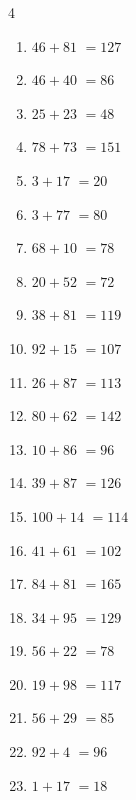 \begin{multicols}{4}
\begin{enumerate}
  \item $46+81$
        $=127$

  \item $46+40$
        $=86$

  \item $25+23$
        $=48$

  \item $78+73$
        $=151$

  \item $3+17$
        $=20$

  \item $3+77$
        $=80$

  \item $68+10$
        $=78$

  \item $20+52$
        $=72$

\columnbreak %

\resetques

  \item $38+81$
        $=119$

  \item $92+15$
        $=107$

  \item $26+87$
        $=113$

  \item $80+62$
        $=142$

  \item $10+86$
        $=96$

  \item $39+87$
        $=126$

  \item $100+14$
        $=114$

  \item $41+61$
        $=102$

  \item $84+81$
        $=165$

  \item $34+95$
        $=129$

  \item $56+22$
        $=78$

  \item $19+98$
        $=117$

  \item $56+29$
        $=85$

  \item $92+4$
        $=96$

  \item $1+17$
        $=18$


\end{enumerate}
\end{multicols}

